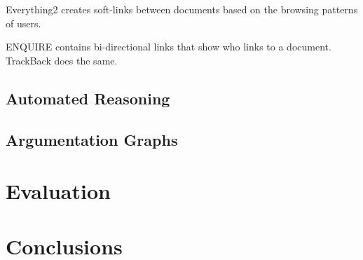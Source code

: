 \documentclass{sig-alt-release2}
\begin{document}
Everything2 creates soft-links between documents based on the browsing patterns of users.

ENQUIRE contains bi-directional links that show who links to a document. TrackBack does the same.

\subsection{Automated Reasoning}

\subsection{Argumentation Graphs}

\section{Evaluation}

\section{Conclusions}
\end{document}
